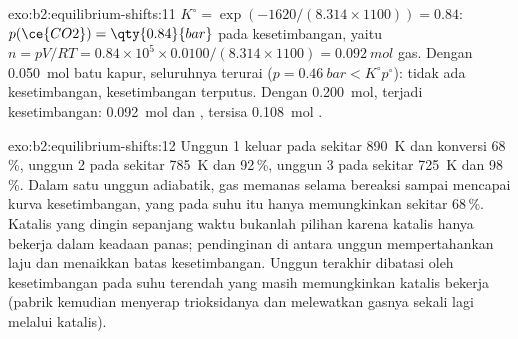 \begin{solution}{exo:b2:equilibrium-shifts:11}
$K^\circ = \exp(-1620/(8.314 \times 1100)) = 0.84$: $p(\ce{CO2}) =
\qty{0.84}{bar}$ pada kesetimbangan, yaitu $n = pV/RT = 0.84 \times 10^5 \times
0.0100/(8.314 \times 1100) = \qty{0.092}{mol}$ gas. Dengan \qty{0.050}{mol}
batu kapur, seluruhnya terurai ($p = \qty{0.46}{bar} < K^\circ p^\circ$):
tidak ada kesetimbangan, kesetimbangan terputus. Dengan \qty{0.200}{mol},
terjadi kesetimbangan: \qty{0.092}{mol}  dan , tersisa
\qty{0.108}{mol} .
\end{solution}

\begin{solution}{exo:b2:equilibrium-shifts:12}
Unggun 1 keluar pada sekitar \qty{890}{K} dan konversi 68\,\%, unggun 2
pada sekitar \qty{785}{K} dan 92\,\%, unggun 3 pada sekitar \qty{725}{K}
dan 98\,\%. Dalam satu unggun adiabatik, gas memanas selama bereaksi
sampai mencapai kurva kesetimbangan, yang pada suhu itu hanya
memungkinkan sekitar 68\,\%. Katalis yang dingin sepanjang waktu bukanlah
pilihan karena katalis hanya bekerja dalam keadaan panas; pendinginan di
antara unggun mempertahankan laju dan menaikkan batas kesetimbangan.
Unggun terakhir dibatasi oleh kesetimbangan pada suhu terendah yang masih
memungkinkan katalis bekerja (pabrik kemudian menyerap trioksidanya dan
melewatkan gasnya sekali lagi melalui katalis).
\end{solution}

